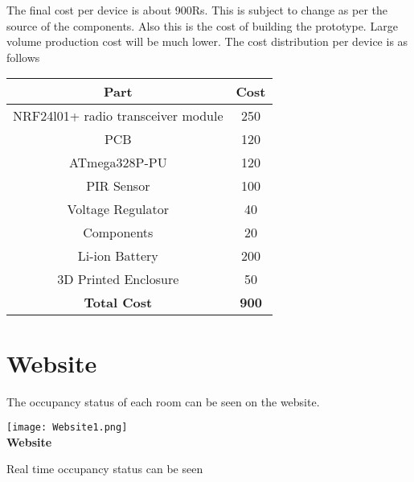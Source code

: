 The final cost per device is about 900Rs. This is subject to change as per the source of the components. Also this is the cost of building the prototype. Large volume production cost will be much lower.
The cost distribution per device is as follows
\\
\begin{center}
	\begin{tabular}{|c|c|}
		\hline
		\textbf{Part} & \textbf{Cost}	\\			\hline
		NRF24l01+ radio transceiver module & 250 \\	\hline
		PCB & 120 \\								\hline
		ATmega328P-PU &120 \\						\hline
		PIR Sensor & 100 \\							\hline
		Voltage Regulator & 40 \\					\hline
		Components & 20 \\							\hline
		Li-ion Battery & 200 \\						\hline
		3D Printed Enclosure & 50 \\				\hline
		\textbf{Total Cost}& \textbf{900} \\		\hline
	\end{tabular}
\end{center}

\pagebreak

\section{Website}
The occupancy status of each room can be seen on the website.

\begin{center}
	\texttt{[image: Website1.png]}
	\\ \textbf{Website}
\end{center}

Real time occupancy status can be seen 


